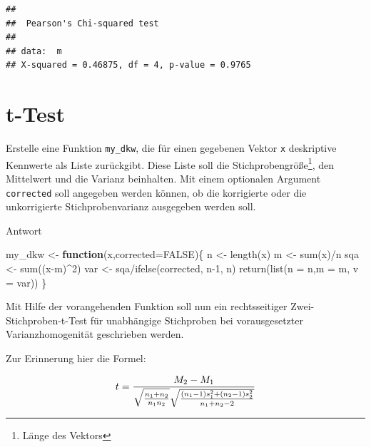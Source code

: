 \documentclass[
]{book}
\newenvironment{Shaded}{\begin{snugshade}}{\end{snugshade}}
\newcommand{\AttributeTok}[1]{\textcolor[rgb]{0.77,0.63,0.00}{#1}}
\newcommand{\ConstantTok}[1]{\textcolor[rgb]{0.00,0.00,0.00}{#1}}
\newcommand{\ControlFlowTok}[1]{\textcolor[rgb]{0.13,0.29,0.53}{\textbf{#1}}}
\newcommand{\DecValTok}[1]{\textcolor[rgb]{0.00,0.00,0.81}{#1}}
\newcommand{\FunctionTok}[1]{\textcolor[rgb]{0.00,0.00,0.00}{#1}}
\newcommand{\NormalTok}[1]{#1}
\newcommand{\OtherTok}[1]{\textcolor[rgb]{0.56,0.35,0.01}{#1}}
\newcommand{\SpecialCharTok}[1]{\textcolor[rgb]{0.00,0.00,0.00}{#1}}
\begin{document}
\begin{verbatim}
## 
##  Pearson's Chi-squared test
## 
## data:  m
## X-squared = 0.46875, df = 4, p-value = 0.9765
\end{verbatim}

\hypertarget{t-test}{%
\section{t-Test}\label{t-test}}

Erstelle eine Funktion \texttt{my\_dkw}, die für einen gegebenen Vektor \texttt{x} deskriptive Kennwerte als Liste zurückgibt.
Diese Liste soll die Stichprobengröße\footnote{Länge des Vektors}, den Mittelwert und die Varianz beinhalten.
Mit einem optionalen Argument \texttt{corrected} soll angegeben werden können, ob die korrigierte oder die unkorrigierte Stichprobenvarianz ausgegeben werden soll.

Antwort

\begin{Shaded}
\begin{Highlighting}[]
\NormalTok{my\_dkw }\OtherTok{\textless{}{-}} \ControlFlowTok{function}\NormalTok{(x,}\AttributeTok{corrected=}\ConstantTok{FALSE}\NormalTok{)\{ }
\NormalTok{  n }\OtherTok{\textless{}{-}} \FunctionTok{length}\NormalTok{(x)                  }
\NormalTok{  m }\OtherTok{\textless{}{-}} \FunctionTok{sum}\NormalTok{(x)}\SpecialCharTok{/}\NormalTok{n                     }
\NormalTok{  sqa }\OtherTok{\textless{}{-}} \FunctionTok{sum}\NormalTok{((x}\SpecialCharTok{{-}}\NormalTok{m)}\SpecialCharTok{\^{}}\DecValTok{2}\NormalTok{)                 }
\NormalTok{  var }\OtherTok{\textless{}{-}}\NormalTok{ sqa}\SpecialCharTok{/}\FunctionTok{ifelse}\NormalTok{(corrected, n}\DecValTok{{-}1}\NormalTok{, n)  }
  \FunctionTok{return}\NormalTok{(}\FunctionTok{list}\NormalTok{(}\AttributeTok{n =}\NormalTok{ n,}\AttributeTok{m =}\NormalTok{ m, }\AttributeTok{v =}\NormalTok{ var))}
\NormalTok{\}}
\end{Highlighting}
\end{Shaded}

Mit Hilfe der vorangehenden Funktion soll nun ein rechtsseitiger Zwei-Stichproben-t-Test für unabhängige Stichproben bei vorausgesetzter Varianzhomogenität geschrieben werden.

Zur Erinnerung hier die Formel:

\[t={\frac {{M_2}-{M_1}}{\sqrt{\frac{\vphantom{(s_1^2}n_1+n_2}{n_1n_2}}\sqrt{{\frac  {(n_1-1)s_{1}^{2}+(n_2-1)s_{2}^{2}}{\vphantom{n^2}n_1+n_2-2}}}}}\]
\end{document}
